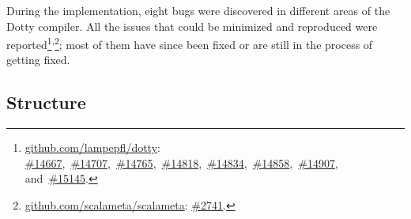 During the implementation, eight bugs were discovered in different areas of the Dotty compiler. All the issues that could be minimized and reproduced were reported\footnote{
\href{https://github.com/lampepfl/dotty}{github.com/lampepfl/dotty}:
\href{https://github.com/lampepfl/dotty/issues/14667}{\#14667},\
\href{https://github.com/lampepfl/dotty/issues/14707}{\#14707},\
\href{https://github.com/lampepfl/dotty/issues/14765}{\#14765},\
\href{https://github.com/lampepfl/dotty/issues/14818}{\#14818},\
\href{https://github.com/lampepfl/dotty/issues/14834}{\#14834},\
\href{https://github.com/lampepfl/dotty/issues/14858}{\#14858},\
\href{https://github.com/lampepfl/dotty/issues/14907}{\#14907}, and\
\href{https://github.com/lampepfl/dotty/issues/15145}{\#15145}.
}\textsuperscript{,}\footnote{
\href{https://github.com/scalameta/scalameta}{github.com/scalameta/scalameta}:
\href{https://github.com/scalameta/scalameta/issues/2741}{\#2741}.
}; most of them have since been fixed or are still in the process of getting fixed.

\subsection{Structure}

